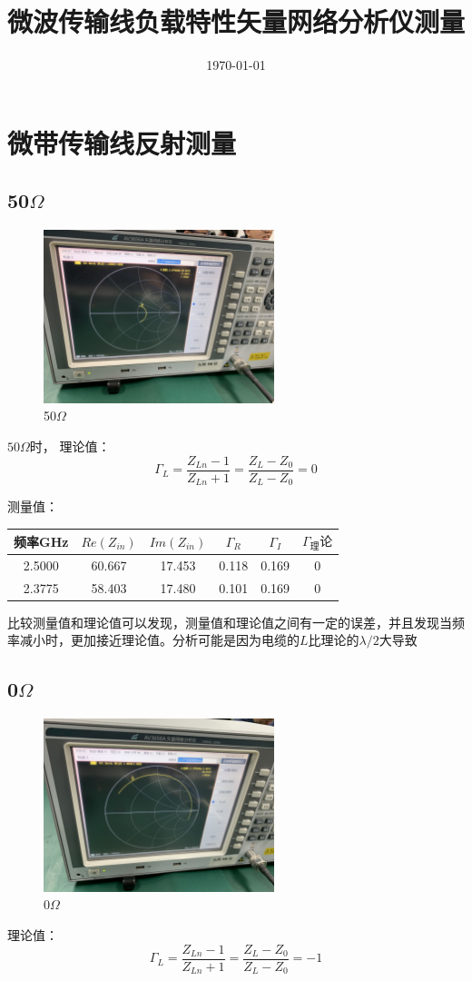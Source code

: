 \documentclass{../source/Experiment}
\title{微波传输线负载特性矢量网络分析仪测量}
\date{\today}
\begin{document}
\makecover
\makeheader

\section{微带传输线反射测量}
\subsection{50$\Omega$}
\begin{figure}[H]
    \centering
    \includegraphics[width = 0.6\textwidth]{pic/49.92}
    \caption{50$\Omega$}
\end{figure}
$50\Omega$时，
理论值：$$\Gamma _L = \frac{Z_{Ln}-1}{Z_{Ln}+1} = \frac{Z_L - Z_0}{Z_L - Z_0} = 0$$

测量值：
\begin{table}[H]
    \centering
    \begin{tabular}{|c|c|c|c|c|c|}
        \hline
        频率GHz & $Re(Z_{in})$ & $Im(Z_{in})$ & $\Gamma _R$ & $\Gamma _I$ & $\Gamma _理论$ \\ \hline
        2.5000  & 60.667       & 17.453       & 0.118       & 0.169       & 0              \\ \hline
        2.3775  & 58.403       & 17.480       & 0.101       & 0.169       & 0              \\ \hline
    \end{tabular}
\end{table}
比较测量值和理论值可以发现，测量值和理论值之间有一定的误差，并且发现当频率减小时，更加接近理论值。分析可能是因为电缆的$L$比理论的$\lambda /2$大导致


\subsection{0$\Omega$}
\begin{figure}[H]
    \centering
    \includegraphics[width = 0.6\textwidth]{pic/02}
    \caption{0$\Omega$}
\end{figure}
理论值：$$\Gamma _L = \frac{Z_{Ln}-1}{Z_{Ln}+1} = \frac{Z_L - Z_0}{Z_L - Z_0} = -1$$
\end{document}
